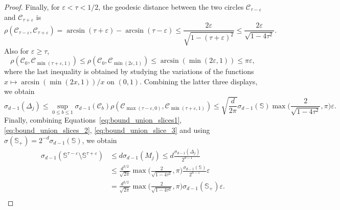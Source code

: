 \documentclass[10pt,a4paper]{amsart}
\newcommand{\sphere}{\mathbb{S}}
\begin{document}
\begin{proof}
      Finally, for $\varepsilon<\tau <1/2$, the geodesic distance between the two circles $\mathcal{C}_{\tau- \varepsilon }$ and $\mathcal{C}_{\tau+\varepsilon }$ is
      $$
      \rho(\mathcal{C}_{\tau-\varepsilon }, \mathcal{C}_{\tau+\varepsilon }) =
      \arcsin(\tau+\varepsilon ) - \arcsin(\tau-\varepsilon ) \le
      \frac{2 \varepsilon }{\sqrt{1 - (\tau+\varepsilon )^2}} \le 
      \frac{2 \varepsilon }{\sqrt{1 - 4\tau^2}}.
      $$
      Also for $\varepsilon\ge \tau$, 
$$
      \rho(\mathcal{C}_{0}, \mathcal{C}_{\min(\tau+\varepsilon,1) }) \le 
      \rho(\mathcal{C}_{0}, \mathcal{C}_{\min(2\varepsilon,1) }) \le 
      \arcsin(\min(2\varepsilon,1)) \le \pi\varepsilon,
      $$
      where the last inequality is obtained by studying the variations of the functions $x\mapsto \arcsin(\min(2x,1))/x$ on $(0,1)$. 
      Combining the latter  three displays, we obtain 
      \begin{equation}\label{eq:bound_union_slice_3}
      \sigma_{d-1}(\Delta_j) \le \sup_{0\le b\le 1}\sigma_{d-1}(\mathcal{C}_b)\rho(\mathcal{C}_{\max(\tau-\varepsilon,0) }, \mathcal{C}_{\min(\tau+\varepsilon,1) }) 
      \le \sqrt{\frac{d}{2\pi}} \sigma_{d-1}(\sphere)
      \max\Big(\frac{2 }{\sqrt{1 - 4\tau^2}}, 
       {\pi}\Big)\varepsilon.
      \end{equation}
      Finally,  combining Equations~\eqref{eq:bound_union_slices1}, \eqref{eq:bound_union_slices_2}, \eqref{eq:bound_union_slice_3} and using $\sigma(\sphere_+) = 2^{-d}\sigma_{d-1}(\sphere)$, we obtain
      \begin{align*}
      \sigma_{d-1}(\sphere^{\tau-\varepsilon}\setminus\sphere^{\tau+\varepsilon}) 
      & \le 
      d \sigma_{d-1}(M_j) \le d \frac{\sigma_{d-1}(\Delta_j)}{2^{d-1}}\\
      &\le \frac{d^{3/2}}{\sqrt{2\pi}}
      \max\Big(\frac{2 }{\sqrt{1 - 4\tau^2}}, 
       \pi %
       \Big)
      \frac{\sigma_{d-1}(\sphere)}{2^{d-1}} \varepsilon\\
      &=\frac{d^{3/2}}{\sqrt{2\pi}}
      \max\Big(\frac{2 }{\sqrt{1 - 4\tau^2}}, 
       \pi%
       \Big)
      \sigma_{d-1}(\sphere_+) \varepsilon.\\

\end{align*}
\end{proof}
\end{document}
